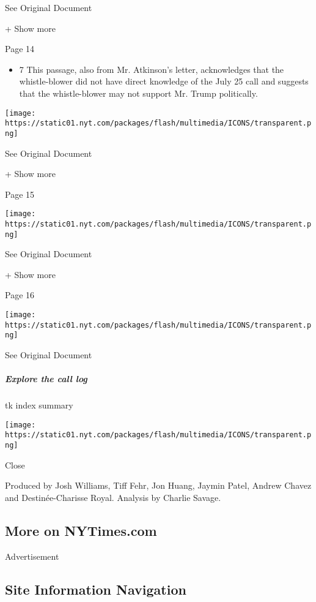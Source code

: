 See Original Document

+ Show more

Page 14

\begin{itemize}
\tightlist
\item
  7 This passage, also from Mr. Atkinson's letter, acknowledges that the
  whistle-blower did not have direct knowledge of the July 25 call and
  suggests that the whistle-blower may not support Mr. Trump
  politically.
\end{itemize}

\protect\hyperlink{}{}

\texttt{[image: https://static01.nyt.com/packages/flash/multimedia/ICONS/transparent.png]}

See Original Document

+ Show more

Page 15

\protect\hyperlink{}{}

\texttt{[image: https://static01.nyt.com/packages/flash/multimedia/ICONS/transparent.png]}

See Original Document

+ Show more

Page 16

\protect\hyperlink{}{}

\texttt{[image: https://static01.nyt.com/packages/flash/multimedia/ICONS/transparent.png]}

See Original Document

\hypertarget{explore-the-call-log}{%
\subparagraph{Explore the call log}\label{explore-the-call-log}}

tk index summary

\texttt{[image: https://static01.nyt.com/packages/flash/multimedia/ICONS/transparent.png]}

Close

Produced by Josh Williams, Tiff Fehr, Jon Huang, Jaymin Patel, Andrew
Chavez and Destinée-Charisse Royal. Analysis by Charlie Savage.

\hypertarget{more-on-nytimescom}{%
\subsection{More on NYTimes.com}\label{more-on-nytimescom}}

Advertisement

\hypertarget{site-information-navigation}{%
\subsection{Site Information
Navigation}\label{site-information-navigation}}

